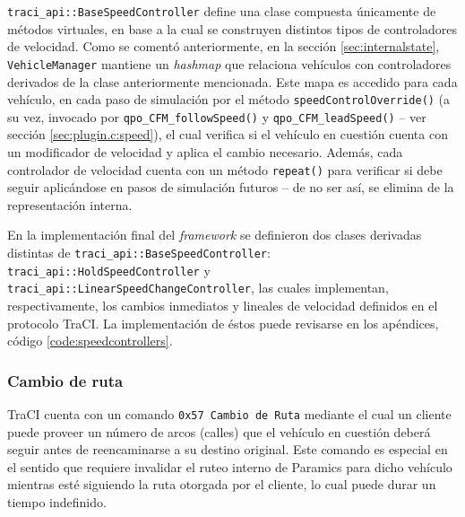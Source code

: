 \texttt{traci\_api::BaseSpeedController} define una clase compuesta únicamente de métodos virtuales, en base a la cual se construyen distintos tipos de controladores de velocidad. Como se comentó anteriormente, en la sección \ref{sec:internalstate}, \texttt{VehicleManager} mantiene un \emph{hashmap} que relaciona vehículos con controladores derivados de la clase anteriormente mencionada. Este mapa es accedido para cada vehículo, en cada paso de simulación por el método \texttt{speedControlOverride()} (a su vez, invocado por \texttt{qpo\_CFM\_followSpeed()} y \texttt{qpo\_CFM\_leadSpeed()} -- ver sección \ref{sec:plugin.c:speed}), el cual verifica si el vehículo en cuestión cuenta con un modificador de velocidad y aplica el cambio necesario. Además, cada controlador de velocidad cuenta con un método \texttt{repeat()} para verificar si debe seguir aplicándose en pasos de simulación futuros -- de no ser así, se elimina de la representación interna.

\begin{figure}[htpb]
    
\end{figure}


En la implementación final del \emph{framework} se definieron dos clases derivadas distintas de \texttt{traci\_api::BaseSpeedController}: \texttt{traci\_api::HoldSpeedController} y \texttt{traci\_api::LinearSpeedChangeController}, las cuales implementan, respectivamente, los cambios inmediatos y lineales de velocidad definidos en el protocolo TraCI. La implementación de éstos puede revisarse en los apéndices, código \ref{code:speedcontrollers}.

\subsubsection{Cambio de ruta}\label{sec:routeoverride}

TraCI cuenta con un comando \texttt{0x57 Cambio de Ruta} mediante el cual un cliente puede proveer un número de arcos (calles) que el vehículo en cuestión deberá seguir antes de reencaminarse a su destino original. Este comando es especial en el sentido que requiere invalidar el ruteo interno de Paramics para dicho vehículo mientras esté siguiendo la ruta otorgada por el cliente, lo cual puede durar un tiempo indefinido.

